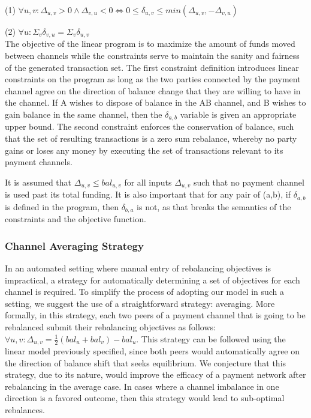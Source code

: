 \documentclass[sigconf]{acmart}
\begin{document}
\noindent
(1) $\forall u, v: \Delta_{u,v} > 0 \wedge \Delta_{v,u} < 0 \Leftrightarrow 0 \leq \delta_{u,v} \leq min(\Delta_{u,v}, -\Delta_{v,u}) $

\noindent
(2) $\forall u: \Sigma_{v} \delta_{v,u} = \Sigma_{v} \delta_{u,v} $\\

The objective of the linear program is to maximize the amount of funds moved between channels while the constraints serve to maintain the sanity and fairness of the generated transaction set.
The first constraint definition introduces linear constraints on the program as long as the two parties connected by the payment channel agree on the direction of balance change that they are willing to have in the channel. If A wishes to dispose of balance in the AB channel, and B wishes to gain balance in the same channel, then the $\delta_{a,b}$ variable is given an appropriate upper bound.
The second constraint enforces the conservation of balance, such that the set of resulting transactions is a zero sum rebalance, whereby no party gains or loses any money by executing the set of transactions relevant to its payment channels.

It is assumed that $\Delta_{u,v} \leq bal_{u,v}$ for all inputs $\Delta_{u,v}$ such that no payment channel is used past its total funding. It is also important that for any pair of (a,b), if $\delta_{a,b}$ is defined in the program, then $\delta_{b,a}$ is not, as that breaks the semantics of the constraints and the objective function.

\subsubsection{Channel Averaging Strategy}

In an automated setting where manual entry of rebalancing objectives is impractical, a strategy for automatically determining a set of objectives for each channel is required. To simplify the process of adopting our model in such a setting, we suggest the use of a straightforward strategy: averaging.
More formally, in this strategy, each two peers of a payment channel that is going to be rebalanced submit their rebalancing objectives as follows: $\forall u, v: \Delta_{u, v} = \frac{1}{2}(bal_u+bal_v) - bal_u$. This strategy can be followed using the linear model previously specified, since both peers would automatically agree on the direction of balance shift that seeks equilibrium.
We conjecture that this strategy, due to its nature, would improve the efficacy of a payment network after rebalancing in the average case. In cases where a channel imbalance in one direction is a favored outcome, then this strategy would lead to sub-optimal rebalances.
\end{document}
